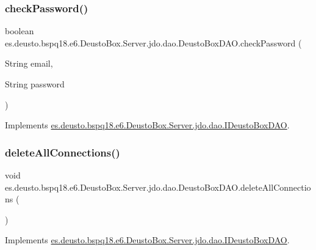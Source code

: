 \subsubsection{\texorpdfstring{check\+Password()}{checkPassword()}}
{\footnotesize\ttfamily boolean es.\+deusto.\+bspq18.\+e6.\+Deusto\+Box.\+Server.\+jdo.\+dao.\+Deusto\+Box\+D\+A\+O.\+check\+Password (\begin{DoxyParamCaption}\item[{String}]{email,  }\item[{String}]{password }\end{DoxyParamCaption})}



Implements \mbox{\hyperlink{interfacees_1_1deusto_1_1bspq18_1_1e6_1_1_deusto_box_1_1_server_1_1jdo_1_1dao_1_1_i_deusto_box_d_a_o_a4d9024d3a5d8cf9087be17d33f34363f}{es.\+deusto.\+bspq18.\+e6.\+Deusto\+Box.\+Server.\+jdo.\+dao.\+I\+Deusto\+Box\+D\+AO}}.

\mbox{\label{classes_1_1deusto_1_1bspq18_1_1e6_1_1_deusto_box_1_1_server_1_1jdo_1_1dao_1_1_deusto_box_d_a_o_ab3e381e995e007128725c851650d2fde}} 
\subsubsection{\texorpdfstring{delete\+All\+Connections()}{deleteAllConnections()}}
{\footnotesize\ttfamily void es.\+deusto.\+bspq18.\+e6.\+Deusto\+Box.\+Server.\+jdo.\+dao.\+Deusto\+Box\+D\+A\+O.\+delete\+All\+Connections (\begin{DoxyParamCaption}{ }\end{DoxyParamCaption})}



Implements \mbox{\hyperlink{interfacees_1_1deusto_1_1bspq18_1_1e6_1_1_deusto_box_1_1_server_1_1jdo_1_1dao_1_1_i_deusto_box_d_a_o_aaa74b50c17c4bdfd4a8868a180375cde}{es.\+deusto.\+bspq18.\+e6.\+Deusto\+Box.\+Server.\+jdo.\+dao.\+I\+Deusto\+Box\+D\+AO}}.

